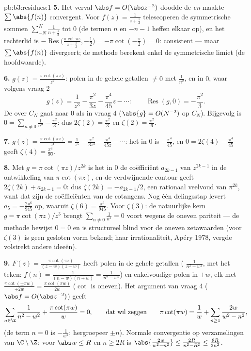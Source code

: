 \begin{solution}{pb:b3:residues:1}
\textbf{5.} Het verval $\abs f = O(\abs z^{-2})$ doodde de
 \emph{en} maakte $\sum\abs{f(n)}$ convergent.
Voor $f(z) = \frac1{z + \frac12}$ telescoperen de symmetrische
sommen $\sum_{-N}^N\frac1{n + \frac12}$ tot $0$ (de termen $n$ en
$-n - 1$ heffen elkaar op), en het rechterlid is
$-\operatorname{Res}\bigl(\frac{\pi\cot\pi z}{z + \frac12},
-\frac12\bigr) = -\pi\cot(-\frac\pi2) = 0$: consistent --- maar
$\sum\abs{f(n)}$ divergeert; de methode berekent enkel de
symmetrische limiet (de hoofdwaarde).

\textbf{6.} $g(z) = \frac{\pi\cot(\pi z)}{z^2}$: polen in de
gehele getallen $\neq 0$ met  $\frac1{n^2}$, en in $0$,
waar volgens vraag 2
\[
g(z) = \frac1{z^3} - \frac{\pi^2}{3z} - \frac{\pi^4}{45}z -
\cdots :
\qquad \operatorname{Res}(g, 0) = -\frac{\pi^2}3 .
\]
De  over $C_N$ gaat naar $0$ als in vraag 4
($\abs{g} = O(N^{-2})$ op $C_N$). Bijgevolg is $0 =
\sum_{n\neq0}\frac1{n^2} - \frac{\pi^2}3$: dus $2\zeta(2) =
\frac{\pi^2}3$ en $\zeta(2) = \frac{\pi^2}6$.

\textbf{7.} $g(z) = \frac{\pi\cot(\pi z)}{z^4} = \frac1{z^5} -
\frac{\pi^2}{3z^3} - \frac{\pi^4}{45z} - \cdots$: het  in
$0$ is $-\frac{\pi^4}{45}$, en $0 = 2\zeta(4) - \frac{\pi^4}{45}$
geeft $\zeta(4) = \frac{\pi^4}{90}$.

\textbf{8.} Met $g = \pi\cot(\pi z)/z^{2k}$ is het  in $0$
de coëfficiënt $a_{2k-1}$ van $z^{2k-1}$ in de ontwikkeling van
$\pi\cot(\pi z)$, en de verdwijnende contour geeft $2\zeta(2k) +
a_{2k-1} = 0$: dus $\zeta(2k) = -a_{2k-1}/2$, een rationaal
veelvoud van $\pi^{2k}$, want dat zijn de coëfficiënten van de
cotangens. Nog één delingsstap levert $a_5 = -\frac{2\pi^6}{945}$
op, waaruit $\zeta(6) = \frac{\pi^6}{945}$. Voor $\zeta(3)$: de
natuurlijke kern $g = \pi\cot(\pi z)/z^3$ brengt
$\sum_{n\neq0}\frac1{n^3} = 0$ voort wegens de oneven pariteit
--- de methode bewijst $0 = 0$ en is structureel blind voor de
oneven zetawaarden (voor $\zeta(3)$ is geen gesloten vorm bekend;
haar irrationaliteit, Apéry 1978, vergde volstrekt andere
ideeën).

\textbf{9.} $F(z) = \frac{\pi\cot(\pi z)}{(z - w)(z + w)}$ heeft
polen in de gehele getallen ( $\frac1{n^2 - w^2}$, met
het teken: $f(n) = \frac1{(n-w)(n+w)} = \frac1{n^2 - w^2}$) en
enkelvoudige polen in $\pm w$, elk met  $\frac{\pi\cot(\pm
\pi w)}{\pm2w} = \frac{\pi\cot(\pi w)}{2w}$ ($\cot$ is oneven).
Het argument van vraag 4 ($\abs f = O(\abs z^{-2})$) geeft
\[
\sum_{n\in\Z}\frac1{n^2 - w^2} + \frac{\pi\cot(\pi w)}{w} =
0,
\qquad\text{dat wil zeggen}\qquad
\pi\cot(\pi w) = \frac1w + \sum_{n\geq1}\frac{2w}{w^2 -
n^2},
\]
(de term $n = 0$ is $-\frac1{w^2}$; hergroepeer $\pm n$). Normale
convergentie op  verzamelingen van $\C\setminus\Z$: voor
$\abs w \leq R$ en $n \geq 2R$ is $\abs{\frac{2w}{w^2 - n^2}}
\leq \frac{2R}{n^2 - R^2} \leq \frac{8R}{3n^2}$.


\end{solution}
